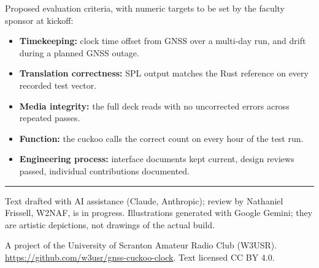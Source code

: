 \documentclass[11pt,letterpaper]{article}
\newcommand{\lead}[1]{\textbf{#1}}
\begin{document}
Proposed evaluation criteria, with numeric targets to be set by the faculty sponsor at
kickoff:

\begin{itemize}
  \item \lead{Timekeeping:} clock time offset from GNSS over a multi-day run, and drift during
    a planned GNSS outage.
  \item \lead{Translation correctness:} SPL output matches the Rust reference on every
    recorded test vector.
  \item \lead{Media integrity:} the full deck reads with no uncorrected errors across repeated
    passes.
  \item \lead{Function:} the cuckoo calls the correct count on every hour of the test run.
  \item \lead{Engineering process:} interface documents kept current, design reviews passed,
    individual contributions documented.
\end{itemize}

\vfill
{\color{rule}\rule{\textwidth}{0.6pt}}\par
{\sffamily\footnotesize\color{quiet}
Text drafted with AI assistance (Claude, Anthropic); review by Nathaniel Frissell, W2NAF, is
in progress. Illustrations generated with Google Gemini; they are artistic depictions, not
drawings of the actual build.\par
A project of the University of Scranton Amateur Radio Club (W3USR).
\url{https://github.com/w3usr/gnss-cuckoo-clock}. Text licensed CC BY 4.0.\par}
\end{document}
